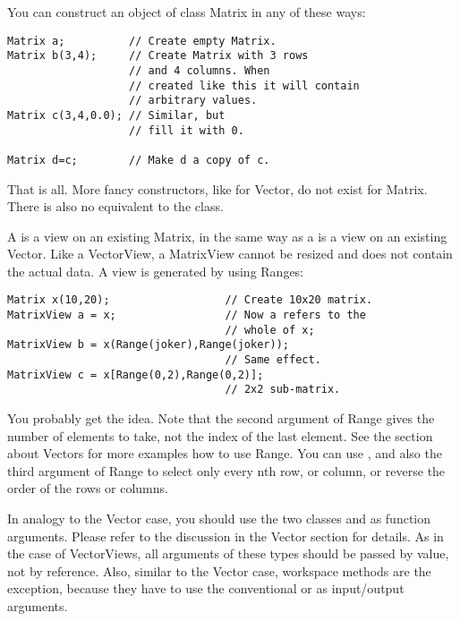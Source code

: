 You can construct an object of class Matrix in any of these ways:

\begin{verbatim}
Matrix a;          // Create empty Matrix.
Matrix b(3,4);     // Create Matrix with 3 rows
                   // and 4 columns. When
                   // created like this it will contain
                   // arbitrary values.
Matrix c(3,4,0.0); // Similar, but
                   // fill it with 0.

Matrix d=c;        // Make d a copy of c.
\end{verbatim}

That is all. More fancy constructors, like for Vector, do not exist
for Matrix. There is also no equivalent to the 
class.


A  is a view on an existing Matrix, in the same way
as a  is a view on an existing Vector. Like a
VectorView, a MatrixView cannot be resized and does not contain the
actual data. A view is generated by using Ranges:

\begin{verbatim}
Matrix x(10,20);                  // Create 10x20 matrix.
MatrixView a = x;                 // Now a refers to the
                                  // whole of x;
MatrixView b = x(Range(joker),Range(joker));
                                  // Same effect.
MatrixView c = x[Range(0,2),Range(0,2)];
                                  // 2x2 sub-matrix.
\end{verbatim}

You probably get the idea. Note that the second argument of Range gives
the number of elements to take, not the index of the last element. See
the section about Vectors for more examples how to use Range. You can
use , and also the third argument of Range to select only
every nth row, or column, or reverse the order of the rows or columns.

In analogy to the Vector case, you should use the two classes
 and  as function arguments.
Please refer to the discussion in the Vector section for details. As
in the case of VectorViews, all arguments of these types should be
passed by value, not by reference. Also, similar to the Vector case,
workspace methods are the exception, because they have to use the
conventional  or  as input/output
arguments.

